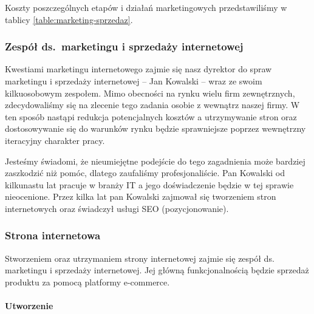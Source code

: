\documentclass[12pt]{article}
\begin{document}
Koszty poszczególnych etapów i działań marketingowych przedstawiliśmy w tablicy \ref{table:marketing-sprzedaz}.


\subsubsection{Zespół ds.\ marketingu i sprzedaży internetowej}

Kwestiami marketingu internetowego zajmie się nasz dyrektor do spraw marketingu i sprzedaży internetowej -- Jan Kowalski -- wraz ze swoim kilkuosobowym zespołem.
Mimo obecności na rynku wielu firm zewnętrznych, zdecydowaliśmy się na zlecenie tego zadania osobie z wewnątrz naszej firmy.
W ten sposób nastąpi redukcja potencjalnych kosztów a utrzymywanie stron oraz dostosowywanie się do warunków rynku będzie sprawniejsze poprzez wewnętrzny iteracyjny charakter pracy.

Jesteśmy świadomi, że nieumiejętne podejście do tego zagadnienia może bardziej zaszkodzić niż pomóc, dlatego zaufaliśmy profesjonaliście.
Pan Kowalski od kilkunastu lat pracuje w branży IT a jego doświadczenie będzie w tej sprawie nieocenione.
Przez kilka lat pan Kowalski zajmował się tworzeniem stron internetowych oraz świadczył usługi SEO (pozycjonowanie).


\subsubsection{Strona internetowa}

Stworzeniem oraz utrzymaniem strony internetowej zajmie się zespół ds. marketingu i sprzedaży internetowej.
Jej główną funkcjonalnością będzie sprzedaż produktu za pomocą platformy e-commerce.

\paragraph{Utworzenie}
\end{document}
